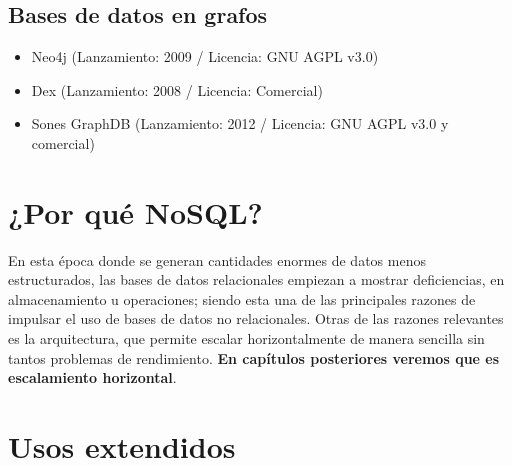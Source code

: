 \subsection*{Bases de datos en grafos}

\begin{itemize}
\item Neo4j (Lanzamiento: 2009 / Licencia: GNU AGPL v3.0)
\item Dex (Lanzamiento: 2008 / Licencia: Comercial)
\item Sones GraphDB (Lanzamiento: 2012 / Licencia: GNU AGPL v3.0 y comercial)
\end{itemize}

\section{¿Por qu\'e NoSQL?}

En esta \'epoca donde se generan cantidades enormes de datos menos estructurados, las bases de datos relacionales empiezan a mostrar deficiencias, en almacenamiento u operaciones; siendo esta una de las principales razones de impulsar el uso de bases de datos no relacionales. Otras de las razones relevantes es la arquitectura, que permite escalar horizontalmente de manera sencilla sin tantos problemas de rendimiento. \textbf{En cap\'itulos posteriores veremos que es escalamiento horizontal}.

\section{Usos extendidos}
